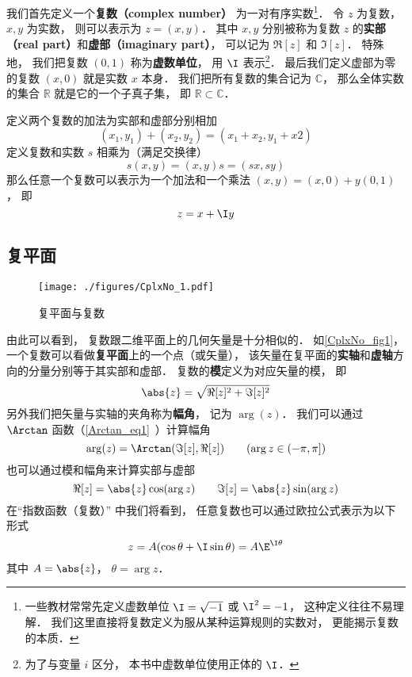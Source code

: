 

我们首先定义一个\textbf{复数（complex number）} 为一对有序实数\footnote{一些教材常常先定义虚数单位 $\I = \sqrt{-1}$ 或 $\I^2 = -1$， 这种定义往往不易理解． 我们这里直接将复数定义为服从某种运算规则的实数对， 更能揭示复数的本质．}． 令 $z$ 为复数， $x, y$ 为实数， 则可以表示为 $z = (x, y)$． 其中 $x,y$ 分别被称为复数 $z$ 的\textbf{实部（real part）}和\textbf{虚部（imaginary part）}， 可以记为 $\Re[z]$ 和 $\Im[z]$． 特殊地， 我们把复数 $(0, 1)$ 称为\textbf{虚数单位}， 用 $\I$ 表示\footnote{为了与变量 $i$ 区分， 本书中虚数单位使用正体的 $\I$．}． 最后我们定义虚部为零的复数 $(x, 0)$ 就是实数 $x$ 本身． 我们把所有复数的集合记为 $\mathbb C$， 那么全体实数的集合 $\mathbb R$ 就是它的一个子真子集， 即 $\mathbb R \subset \mathbb C$．

定义两个复数的加法为实部和虚部分别相加
\begin{equation}\label{CplxNo_eq1}
(x_1, y_1) + (x_2, y_2) = (x_1+ x_2, y_1 + x2)
\end{equation}
定义复数和实数 $s$ 相乘为（满足交换律）
\begin{equation}
s(x, y) = (x, y)s = (sx, sy)
\end{equation}
那么任意一个复数可以表示为一个加法和一个乘法 $(x, y) = (x, 0) + y(0, 1)$， 即
\begin{equation}
z = x + \I y
\end{equation}

\subsection{复平面}
\begin{figure}[ht]
\centering
\texttt{[image: ./figures/CplxNo\_1.pdf]}
\caption{复平面与复数} \label{CplxNo_fig1}
\end{figure}

由此可以看到， 复数跟二维平面上的几何矢量是十分相似的． 如\autoref{CplxNo_fig1}， 一个复数可以看做\textbf{复平面}上的一个点（或矢量）， 该矢量在复平面的\textbf{实轴}和\textbf{虚轴}方向的分量分别等于其实部和虚部． 复数的\textbf{模}定义为对应矢量的模， 即
\begin{equation}
\abs{z} = \sqrt{\Re[z]^2 + \Im[z]^2}
\end{equation}
另外我们把矢量与实轴的夹角称为\textbf{幅角}， 记为 $\arg(z)$． 我们可以通过 $\Arctan$ 函数（\autoref{Arctan_eq1}~）计算幅角
\begin{equation}
\arg(z) = \Arctan(\Im[z], \Re[z])
\qquad (\arg z \in (-\pi, \pi])
\end{equation}
也可以通过模和幅角来计算实部与虚部
\begin{equation}
\Re[z] = \abs{z}\cos(\arg z) \qquad \Im[z] = \abs{z}\sin(\arg z)
\end{equation}
在“指数函数（复数）” 中我们将看到， 任意复数也可以通过欧拉公式表示为以下形式
\begin{equation}
z = A(\cos\theta + \I\sin\theta) = A\E^{\I\theta}
\end{equation}
其中 $A = \abs{z}$， $\theta = \arg z$．

